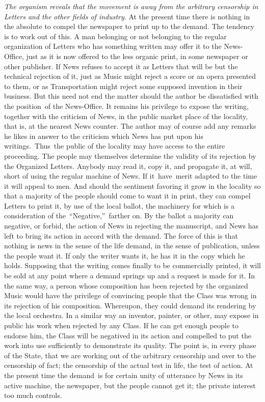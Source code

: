 \documentclass[openany,nobib]{tufte-book}
\begin{document}
\vspace{0.05in}

\emph{The organism reveals that the movement is away from the arbitrary
censorship in Letters and the other fields of industry}. At the present
time there is nothing in the absolute to compel the newspaper to print
up to the demand. The tendency is to work out of this. A man belonging
or not belonging to the regular organization of Letters who has
something written may offer it to the News-Office, just as it is now
offered to the less organic print, in some newspaper or other publisher.
If News refuses to accept it as Letters that will be but the technical
rejection of it, just as Music might reject a score or an opera
presented to them, or as Transportation might reject some supposed
invention in their business. But this need not end the matter should the
author be dissatisfied with the position~of the News-Office. It remains
his privilege to expose the writing, together with the criticism of
News, in the public market place of the locality, that is, at the
nearest News counter. The author may of course add any remarks he likes
in answer to the criticism which News has put upon his
writings.~Thus~the public of the locality may have access to the entire
proceeding. The people may themselves determine the validity of its
rejection by the Organized Letters. Anybody may read it, copy it, and
propagate it, at will, short of using the regular machine of News. If
it~have~merit adapted to the time it will appeal to men. And should the
sentiment favoring it grow in the locality so that a majority of the
people should come to want it in print, they can compel Letters to print
it, by use of the local ballot, the machinery for which is a
consideration of the~``Negative,''~farther on. By the ballot a majority
can negative, or forbid, the action of News in rejecting the manuscript,
and News has left to bring its action in accord with the demand. The
force of this is that nothing is news in the sense of the life demand,
in the sense of publication, unless the people want it. If only the
writer wants it, he has it in the copy which he holds. Supposing that
the writing comes finally to be commercially printed, it will be sold at
any point where a demand springs up and a request is made for it. In the
same way, a person whose composition has been rejected by the organized
Music would have the privilege of convincing people that the Class was
wrong in its rejection of his composition. Whereupon, they could demand
its rendering by the local orchestra. In a similar way an inventor,
painter, or other, may expose in public his work when rejected by any
Class. If he can get enough people to endorse him, the Class will be
negatived in its action and compelled to put the work into use
sufficiently to demonstrate its quality. The point is, in every phase of
the State, that we are working out of the arbitrary censorship and over
to the censorship of fact; the censorship of the actual test in life,
the test of action. At the present time the demand~is for certain unity
of utterance by News in its active machine, the newspaper, but the
people cannot get it; the private interest too much controls.~
\end{document}
